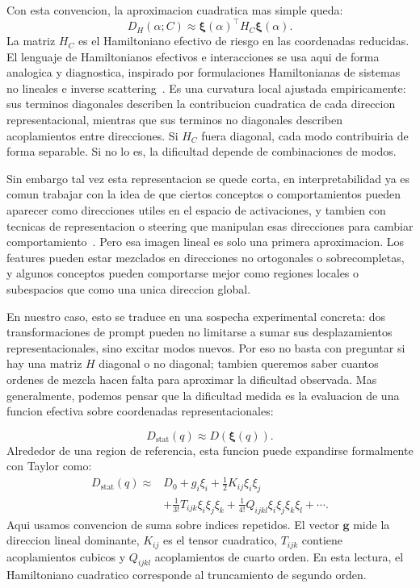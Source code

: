 \documentclass[10pt,twocolumn]{article}
\newcommand{\Dham}{D_{H}}
\newcommand{\cond}{C}
\newcommand{\xrep}{\bm{\xi}}
\begin{document}
Con esta convencion, la aproximacion cuadratica mas simple queda:
\[
\Dham(\alpha;\cond)
\approx
\xrep(\alpha)^{\top}
H_{\cond}
\xrep(\alpha).
\]
La matriz \(H_{\cond}\) es el Hamiltoniano efectivo de riesgo en las coordenadas reducidas. El lenguaje de Hamiltonianos efectivos e interacciones se usa aqui de forma analogica y diagnostica, inspirado por formulaciones Hamiltonianas de sistemas no lineales e inverse scattering~\cite{zakharov1972exact,faddeev2007hamiltonian}. Es una curvatura local ajustada empiricamente: sus terminos diagonales describen la contribucion cuadratica de cada direccion representacional, mientras que sus terminos no diagonales describen acoplamientos entre direcciones. Si \(H_{\cond}\) fuera diagonal, cada modo contribuiria de forma separable. Si no lo es, la dificultad depende de combinaciones de modos.

Sin embargo tal vez esta representacion se quede corta, en interpretabilidad ya es comun trabajar con la idea de que ciertos conceptos o comportamientos pueden aparecer como direcciones utiles en el espacio de activaciones, y tambien con tecnicas de representacion o steering que manipulan esas direcciones para cambiar comportamiento~\cite{zou2023representation}. Pero esa imagen lineal es solo una primera aproximacion. Los features pueden estar mezclados en direcciones no ortogonales o sobrecompletas, y algunos conceptos pueden comportarse mejor como regiones locales o subespacios que como una unica direccion global.

En nuestro caso, esto se traduce en una sospecha experimental concreta: dos transformaciones de prompt pueden no limitarse a sumar sus desplazamientos representacionales, sino excitar modos nuevos. Por eso no basta con preguntar si hay una matriz \(H\) diagonal o no diagonal; tambien queremos saber cuantos ordenes de mezcla hacen falta para aproximar la dificultad observada. Mas generalmente, podemos pensar que la dificultad medida es la evaluacion de una funcion efectiva sobre coordenadas representacionales:



\[
D_{\mathrm{stat}}(q)
\approx
D(\xrep(q)).
\]
Alrededor de una region de referencia, esta funcion puede expandirse formalmente con Taylor como:
\[
\begin{aligned}
D_{\mathrm{stat}}(q)
\approx{}&
D_0
+g_i\xi_i
+\frac{1}{2}K_{ij}\xi_i\xi_j\\
&+\frac{1}{3!}T_{ijk}\xi_i\xi_j\xi_k
+\frac{1}{4!}Q_{ijkl}\xi_i\xi_j\xi_k\xi_l
+\cdots .
\end{aligned}
\]
Aqui usamos convencion de suma sobre indices repetidos. El vector \(\bm{g}\) mide la direccion lineal dominante, \(K_{ij}\) es el tensor cuadratico, \(T_{ijk}\) contiene acoplamientos cubicos y \(Q_{ijkl}\) acoplamientos de cuarto orden. En esta lectura, el Hamiltoniano cuadratico corresponde al truncamiento de segundo orden.
\end{document}
